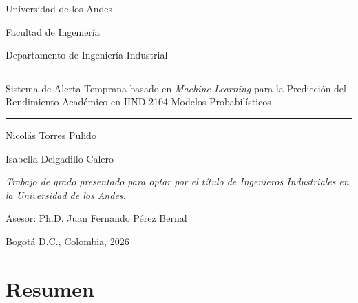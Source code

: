 \documentclass[12pt, letterpaper, openany]{report}
\begin{document}

\begin{titlepage}
  \centering

  {\normalsize Universidad de los Andes\par}
  {\normalsize Facultad de Ingeniería\par}
  {\normalsize Departamento de Ingeniería Industrial\par}

  \vspace{1.5cm}
  \noindent\rule{\textwidth}{0.4pt}
  \vspace{0.5cm}

  {\LARGE Sistema de Alerta Temprana basado en \textit{Machine Learning}
  para la Predicción del Rendimiento Académico en IIND-2104
  Modelos Probabilísticos\par}

  \vspace{0.5cm}
  \noindent\rule{\textwidth}{0.4pt}

  \vspace{2cm}

  {\normalsize Nicolás Torres Pulido\par}
  {\normalsize Isabella Delgadillo Calero\par}

  \vspace{2cm}

  {\small \textit{Trabajo de grado presentado para optar por el título
  de Ingenieros Industriales en la Universidad de los Andes.}\par}

  \vspace{2cm}

  {\small Asesor: Ph.D. Juan Fernando Pérez Bernal\par}

  \vfill

  {\normalsize Bogotá D.C., Colombia, 2026\par}

\end{titlepage}

\chapter*{Resumen}
\end{document}
